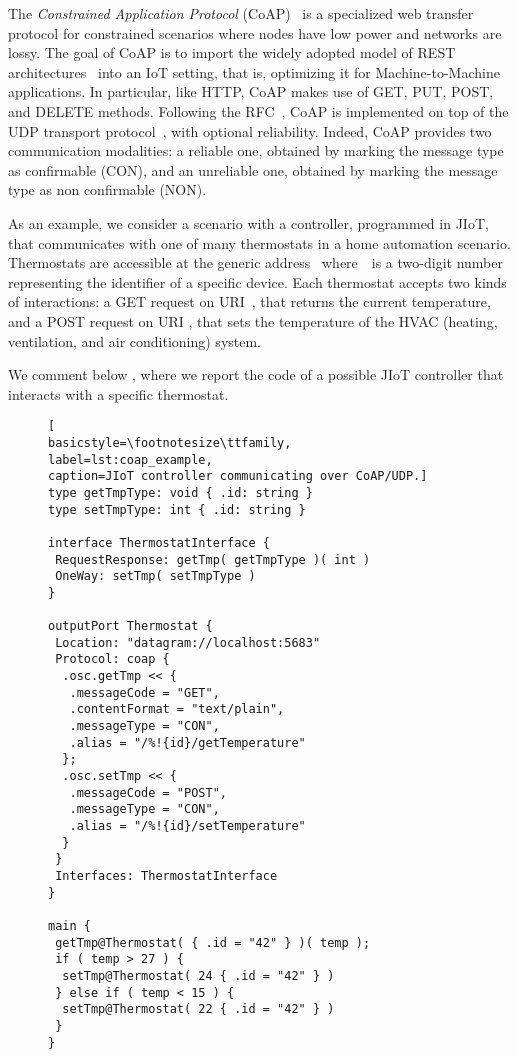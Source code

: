 The \textit{Constrained Application Protocol}
(CoAP)~\cite{coap,doi:10.17487/RFC7252} is a specialized web transfer protocol
for constrained scenarios where nodes have low power and networks are lossy. The
goal of CoAP is to import the widely adopted model of REST
architectures~\cite{fielding00} into an IoT setting, that is, optimizing it for
Machine-to-Machine applications. In particular, like HTTP,
CoAP makes use of GET, PUT,
POST, and DELETE methods.
%
Following the RFC~\cite{doi:10.17487/RFC7252}, CoAP is implemented on top of the
UDP transport protocol~\cite{UDP}, with optional reliability. Indeed, CoAP
provides two communication modalities: a reliable one, obtained by marking the
message type as confirmable (CON), and an unreliable one, obtained by marking the
message type as non confirmable (NON).

As an example, we consider a scenario with a controller, programmed in 
JIoT, that communicates with one of many thermostats 
in a home automation scenario.
Thermostats are accessible at the generic address~ 
where~~is a two-digit number representing the identifier 
of a specific device. 
Each thermostat accepts two kinds of interactions: a GET request on 
URI~,
that returns the current temperature, and a POST
request on URI , 
that sets the temperature of the HVAC (heating, ventilation, and air
conditioning) system.

We comment below , where we report the code of a
possible JIoT controller that interacts with a specific thermostat.

\begin{figure}[t]
\begin{lstlisting}[
basicstyle=\footnotesize\ttfamily,
label=lst:coap_example,
caption=JIoT controller communicating over CoAP/UDP.]
type getTmpType: void { .id: string }
type setTmpType: int { .id: string }

interface ThermostatInterface {
 RequestResponse: getTmp( getTmpType )( int )
 OneWay: setTmp( setTmpType )
}

outputPort Thermostat {
 Location: "datagram://localhost:5683"
 Protocol: coap {
  .osc.getTmp << {
   .messageCode = "GET",
   .contentFormat = "text/plain",
   .messageType = "CON",
   .alias = "/%!{id}/getTemperature"
  };
  .osc.setTmp << {
   .messageCode = "POST",
   .messageType = "CON",
   .alias = "/%!{id}/setTemperature"  
  }
 }
 Interfaces: ThermostatInterface
}

main {
 getTmp@Thermostat( { .id = "42" } )( temp );
 if ( temp > 27 ) {
  setTmp@Thermostat( 24 { .id = "42" } )
 } else if ( temp < 15 ) {
  setTmp@Thermostat( 22 { .id = "42" } )
 }
}
\end{lstlisting}
\end{figure}

